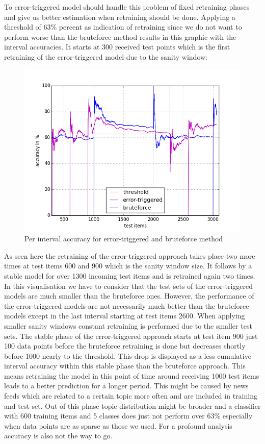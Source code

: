 \documentclass{article} %
\begin{document}
To error-triggered model should handle this problem of fixed retraining phases and give us better estimation when retraining should be done. Applying a threshold of 63\% percent as indication of retraining since we do not want to perform worse than the bruteforce method results in this graphic with the interval accuracies. It starts at 300 received test points which is the first retraining of the error-triggered model due to the sanity window:
 \begin{figure}[htbp]
  \centering
  \includegraphics[scale=0.5]{./plots/errortriggered_bruteforce.png}
  \caption{Per interval accuracy for error-triggered and bruteforce method}
\end{figure}

As seen here the retraining of the error-triggered approach takes place two more times at test items 600 and 900 which is the sanity window size. It  follows by a stable model for over 1300 incoming test items and is retrained again two times. In this visualisation we have to consider that the test sets of the error-triggered models are much smaller than the bruteforce ones. However, the performance of the error-triggered models are not necessarily much better than the bruteforce models except in the last interval starting at test items 2600. When applying smaller sanity windows constant retraining is performed due to the smaller test sets. The stable phase of the error-triggered approach starts at test item 900 just 100 data points before the bruteforce retraining is done but decreases shortly before 1000 nearly to the threshold. This drop is displayed as a less cumulative interval accuracy within this stable phase than the bruteforce approach. This means retraining the model in this point of time around receiving 1000 test items leads to a better prediction for a longer period. This might be caused by news feeds which are related to a certain topic more often and are included in training and test set. Out of this phase topic distribution might be broader and a classifier with 600 training items and 5 classes does just not perform over 63\% especially when data points are as sparse as those we used. For a profound analysis accuracy is also not the way to go.  
\end{document}
